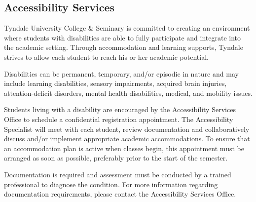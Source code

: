 \subsection{Accessibility Services}
\label{accessibility}

Tyndale University College \& Seminary is committed to creating an
environment where students with disabilities are able to fully
participate and integrate into the academic setting. Through
accommodation and learning supports, Tyndale strives to allow each
student to reach his or her academic potential.

Disabilities can be permanent, temporary, and/or episodic in nature and
may include learning disabilities, sensory impairments, acquired brain
injuries, attention-deficit disorders, mental health disabilities,
medical, and mobility issues.

Students living with a disability are encouraged by the Accessibility
Services Office to schedule a confidential registration appointment. The
Accessibility Specialist will meet with each student, review
documentation and collaboratively discuss and/or implement appropriate
academic accommodations. To ensure that an accommodation plan is active
when classes begin, this appointment must be arranged as soon as
possible, preferably prior to the start of the semester.

Documentation is required and assessment must be conducted by a trained
professional to diagnose the condition. For more information regarding
documentation requirements, please contact the Accessibility Services
Office.